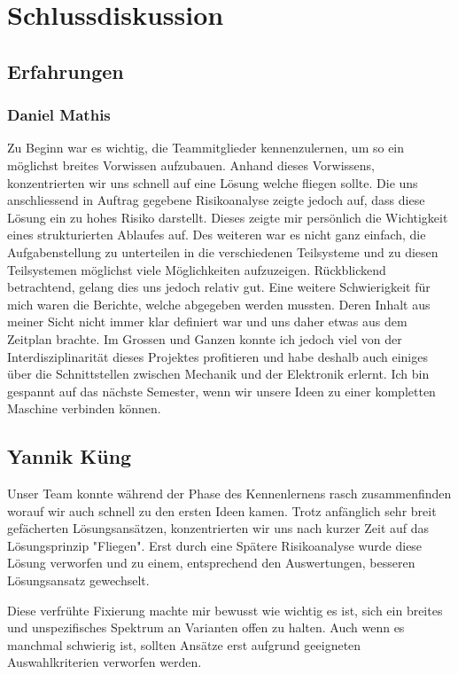 \section{Schlussdiskussion}

\subsection{Erfahrungen}

\subsubsection*{Daniel Mathis}
Zu Beginn war es wichtig, die Teammitglieder kennenzulernen, um so ein 
möglichst breites Vorwissen aufzubauen. Anhand dieses Vorwissens, 
konzentrierten wir uns schnell auf eine Lösung welche fliegen sollte. Die uns 
anschliessend in Auftrag gegebene Risikoanalyse zeigte jedoch auf, dass diese 
Lösung ein zu hohes Risiko darstellt. Dieses zeigte mir persönlich die 
Wichtigkeit eines strukturierten Ablaufes auf. Des weiteren war es nicht ganz 
einfach, die Aufgabenstellung zu unterteilen in die verschiedenen Teilsysteme 
und zu diesen Teilsystemen möglichst viele Möglichkeiten aufzuzeigen. 
Rückblickend betrachtend, gelang dies uns jedoch relativ gut. Eine weitere 
Schwierigkeit für mich waren die Berichte, welche abgegeben werden mussten. 
Deren Inhalt aus meiner Sicht nicht immer klar definiert war und uns daher 
etwas aus dem Zeitplan brachte. Im Grossen und Ganzen konnte ich jedoch viel 
von der Interdisziplinarität dieses Projektes profitieren und habe deshalb 
auch einiges über die Schnittstellen zwischen Mechanik und der Elektronik 
erlernt. Ich bin gespannt auf das nächste Semester, wenn wir unsere Ideen zu 
einer kompletten Maschine verbinden können.

\subsection*{Yannik Küng}
Unser Team konnte während der Phase des Kennenlernens rasch zusammenfinden worauf wir auch schnell zu den ersten Ideen kamen. Trotz anfänglich sehr breit gefächerten Lösungsansätzen, konzentrierten wir uns nach kurzer Zeit auf das Lösungsprinzip "Fliegen". Erst durch eine Spätere Risikoanalyse wurde diese Lösung verworfen und zu einem, entsprechend den Auswertungen, besseren Lösungsansatz gewechselt.

Diese verfrühte Fixierung machte mir bewusst wie wichtig es ist, sich ein breites und unspezifisches Spektrum an Varianten offen zu halten. Auch wenn es manchmal schwierig ist, sollten Ansätze erst aufgrund geeigneten Auswahlkriterien verworfen werden.

